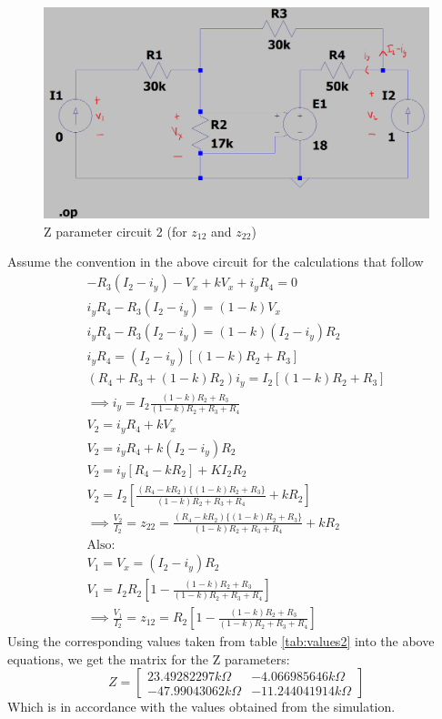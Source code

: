 \documentclass{report}[12pt]
\begin{document}
\begin{figure}[ht]
    \centering
    \includegraphics[scale=0.25]{resources/zparams2.png}
    \caption{Z parameter circuit 2 (for $z_{12}$ and $z_{22}$)}
\end{figure}
Assume the convention in the above circuit for the calculations that follow
\begin{gather*}
    -R_3(I_2-i_y)-V_x+kV_x+i_yR_4=0\\
    i_yR_4-R_3(I_2-i_y)=(1-k)V_x\\
    i_yR_4-R_3(I_2-i_y)=(1-k)(I_2-i_y)R_2\\
    i_yR_4=(I_2-i_y)[(1-k)R_2+R_3]\\
    (R_4+R_3+(1-k)R_2)i_y=I_2[(1-k)R_2+R_3]\\
    \implies i_y=I_2\frac{(1-k)R_2+R_3}{(1-k)R_2+R_3+R_4}\\
    V_2=i_yR_4+kV_x\\
    V_2=i_yR_4+k(I_2-i_y)R_2\\
    V_2=i_y[R_4-kR_2]+KI_2R_2\\
    V_2=I_2\left[\frac{(R_4-kR_2)\{(1-k)R_2+R_3\}}{(1-k)R_2+R_3+R_4}+kR_2\right]\\
    \implies \frac{V_2}{I_2} = \boxed{z_{22} = \frac{(R_4-kR_2)\{(1-k)R_2+R_3\}}{(1-k)R_2+R_3+R_4}+kR_2}\\
    \mathrm{Also:} \\
    V_1=V_x=(I_2-i_y)R_2\\
    V_1=I_2R_2\left[1-\frac{(1-k)R_2+R_3}{(1-k)R_2+R_3+R_4}\right]\\
    \implies \frac{V_1}{I_2} = \boxed{z_{12} = R_2\left[1-\frac{(1-k)R_2+R_3}{(1-k)R_2+R_3+R_4}\right]}
\end{gather*}
\newpage
Using the corresponding values taken from table \hyperref[tab:values2]{\ref{tab:values2}} into the above equations, we get the matrix for the Z parameters:
$$ Z = \begin{bmatrix}
        23.49282297k\Omega  & -4.066985646k\Omega  \\
        -47.99043062k\Omega & -11.244041914k\Omega
    \end{bmatrix}
$$
Which is in accordance with the values obtained from the simulation.
\end{document}
